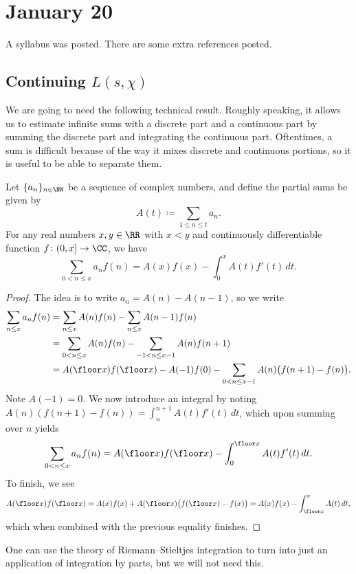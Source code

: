 \documentclass[../notes.tex]{subfiles}
\begin{document}
\section{January 20}

A syllabus was posted. There are some extra references posted.

\subsection{Continuing \texorpdfstring{$L(s,\chi)$}{ L(s, chi)}}
We are going to need the following technical result. Roughly speaking, it allows us to estimate infinite sums with a discrete part and a continuous part by summing the discrete part and integrating the continuous part. Oftentimes, a sum is difficult because of the way it mixes discrete and continuous portions, so it is useful to be able to separate them.
\begin{theorem} \label{thm:abel-summation}
	Let $\{a_n\}_{n\in\NN}$ be a sequence of complex numbers, and define the partial sums be given by
	\[A(t)\coloneqq\sum_{1\le n\le t}a_n.\]
	For any real numbers $x,y\in\RR$ with $x<y$ and continuously differentiable function $f\colon(0,x]\to\CC$, we have
	\[\sum_{0<n\le x}a_nf(n)=A(x)f(x)-\int_0^xA(t)f'(t)\,dt.\]
\end{theorem}
\begin{proof}
	The idea is to write $a_n=A(n)-A(n-1)$, so we write
	\begin{align*}
		\sum_{n\le x}a_nf(n) &= \sum_{n\le x}A(n)f(n)-\sum_{n\le x}A(n-1)f(n) \\
		&= \sum_{0<n\le x}A(n)f(n)-\sum_{-1<n\le x-1}A(n)f(n+1) \\
		&= A(\floor x)f(\floor x)-A(-1)f(0)-\sum_{0<n\le x-1}A(n)\big(f(n+1)-f(n)\big).
	\end{align*}
	Note $A(-1)=0$. We now introduce an integral by noting $A(n)(f(n+1)-f(n))=\int_n^{n+1}A(t)f'(t)\,dt$, which upon summing over $n$ yields
	\[\sum_{0<n\le x}a_nf(n)=A(\floor x)f(\floor x)-\int_0^{\floor x}A(t)f'(t)\,dt.\]
	To finish, we see
	\[A(\floor x)f(\floor x)=A(x)f(x)+A(\floor x)\big(f(\floor x)-f(x)\big)=A(x)f(x)-\int_{\floor x}^xA(t)\,dt,\]
	which when combined with the previous equality finishes.
\end{proof}
\begin{remark}
	One can use the theory of Riemann--Stieltjes integration to turn  into just an application of integration by parts, but we will not need this.
\end{remark}
\end{document}
